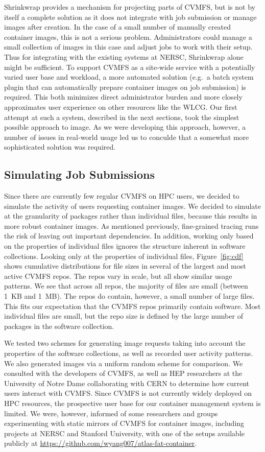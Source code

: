 \documentclass[sigconf]{acmart}
\begin{document}
Shrinkwrap provides a mechanism for projecting parts of CVMFS,
but is not by itself a complete solution as it does not integrate with job submission or manage images after creation.
In the case of a small number of manually created container images,
this is not a serious problem.
Administrators could manage a small collection of images in this case and adjust jobs to work with their setup.
Thus for integrating with the existing systems at NERSC,
Shrinkwrap alone might be sufficient.
To support CVMFS as a site-wide service with a potentially varied user base and workload,
a more automated solution
(e.g.\ a batch system plugin that can automatically prepare container images on job submission)
is required.
This both minimizes direct administrator burden and more closely approximates user experience on other resources like the WLCG.
Our first attempt at such a system,
described in the next sections,
took the simplest possible approach to image.
As we were developing this approach, however,
a number of issues in real-world usage led us to conculde that a somewhat more sophisticated solution was required.

\subsection{Simulating Job Submissions}

Since there are currently few regular CVMFS on HPC users,
we decided to simulate the activity of users requesting container images.
We decided to simulate at the granularity of packages rather than individual files,
because this results in more robust container images.
As mentioned previously,
fine-grained tracing runs the risk of leaving out important dependencies.
In addition, working only based on the properties of individual files ignores the structure inherent in software collections.
Looking only at the properties of individual files,
Figure~\ref{fig:cdf} shows cumulative distributions for file sizes in several of the largest and most active CVMFS repos.
The repos vary in scale,
but all show similar usage patterns.
We see that across all repos,
the majority of files are small (between 1~KB and 1~MB).
The repos do contain, however,
a small number of large files.
This fits our expectation that the CVMFS repos primarily contain software.
Most individual files are small,
but the repo size is defined by the large number of packages in the software collection.

We tested two schemes for generating image requests taking into account the properties of the software collections,
as well as recorded user activity patterns.
We also generated images via a uniform random scheme for comparison.
We consulted with the developers of CVMFS,
as well as HEP researchers at the University of Notre Dame collaborating with CERN to determine how current users interact with CVMFS.
Since CVMFS is not currently widely deployed on HPC resources,
the prospective user base for our container management system is limited.
We were, however, informed of some researchers and groups experimenting with static mirrors of CVMFS for container images,
including projects at NERSC and Stanford University,
with one of the setups available publicly at \url{https://github.com/wyang007/atlas-fat-container}.
\end{document}
